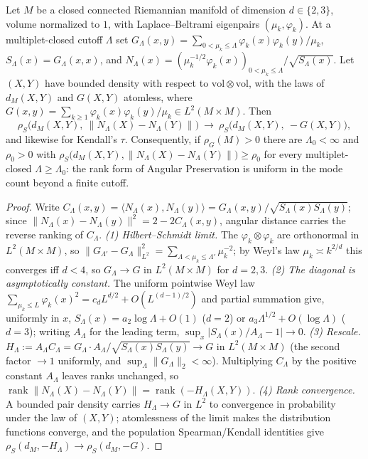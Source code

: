 \documentclass[review,supplement]{siamart220329}
\begin{document}
\begin{theorem}\label{thm:green-rank-limit}
Let $M$ be a closed connected Riemannian manifold of dimension $d\in\{2,3\}$, volume
normalized to $1$, with Laplace--Beltrami eigenpairs $(\mu_k,\varphi_k)$. At a
multiplet-closed cutoff $\Lambda$ set
$G_\Lambda(x,y)=\sum_{0<\mu_k\le\Lambda}\varphi_k(x)\varphi_k(y)/\mu_k$,
$S_\Lambda(x)=G_\Lambda(x,x)$, and
$N_\Lambda(x)=(\mu_k^{-1/2}\varphi_k(x))_{0<\mu_k\le\Lambda}/\sqrt{S_\Lambda(x)}$. Let
$(X,Y)$ have bounded density with respect to $\mathrm{vol}\otimes\mathrm{vol}$, with
the laws of $d_M(X,Y)$ and $G(X,Y)$ atomless, where
$G(x,y)=\sum_{k\ge1}\varphi_k(x)\varphi_k(y)/\mu_k\in L^2(M\times M)$. Then
\[
\rho_S\bigl(d_M(X,Y),\ \lVert N_\Lambda(X)-N_\Lambda(Y)\rVert\bigr)\ \longrightarrow\
\rho_S\bigl(d_M(X,Y),\ -G(X,Y)\bigr),
\]
and likewise for Kendall's $\tau$. Consequently, if $\rho_G(M)>0$ there are
$\Lambda_0<\infty$ and $\rho_0>0$ with
$\rho_S\bigl(d_M(X,Y),\lVert N_\Lambda(X)-N_\Lambda(Y)\rVert\bigr)\ge\rho_0$ for every
multiplet-closed $\Lambda\ge\Lambda_0$: the rank form of Angular Preservation is uniform
in the mode count beyond a finite cutoff.
\end{theorem}

\begin{proof}
Write $C_\Lambda(x,y)=\langle N_\Lambda(x),N_\Lambda(y)\rangle=
G_\Lambda(x,y)/\sqrt{S_\Lambda(x)S_\Lambda(y)}$; since
$\lVert N_\Lambda(x)-N_\Lambda(y)\rVert^2=2-2C_\Lambda(x,y)$, angular distance carries the
reverse ranking of $C_\Lambda$.
\emph{(1) Hilbert--Schmidt limit.} The $\varphi_k\otimes\varphi_k$ are orthonormal in
$L^2(M\times M)$, so $\lVert G_{\Lambda'}-G_\Lambda\rVert^2_{L^2}=
\sum_{\Lambda<\mu_k\le\Lambda'}\mu_k^{-2}$; by Weyl's law $\mu_k\asymp k^{2/d}$ this
converges iff $d<4$, so $G_\Lambda\to G$ in $L^2(M\times M)$ for $d=2,3$.
\emph{(2) The diagonal is asymptotically constant.} The uniform pointwise Weyl law
$\sum_{\mu_k\le L}\varphi_k(x)^2=c_dL^{d/2}+O(L^{(d-1)/2})$ and partial summation give,
uniformly in $x$, $S_\Lambda(x)=a_2\log\Lambda+O(1)$ ($d=2$) or
$a_3\Lambda^{1/2}+O(\log\Lambda)$ ($d=3$); writing $A_\Lambda$ for the leading term,
$\sup_x\lvert S_\Lambda(x)/A_\Lambda-1\rvert\to0$.
\emph{(3) Rescale.} $H_\Lambda:=A_\Lambda C_\Lambda=
G_\Lambda\cdot A_\Lambda/\sqrt{S_\Lambda(x)S_\Lambda(y)}\to G$ in $L^2(M\times M)$ (the
second factor $\to1$ uniformly, and $\sup_\Lambda\lVert G_\Lambda\rVert_2<\infty$).
Multiplying $C_\Lambda$ by the positive constant $A_\Lambda$ leaves ranks unchanged, so
$\operatorname{rank}\lVert N_\Lambda(X)-N_\Lambda(Y)\rVert=\operatorname{rank}(-H_\Lambda(X,Y))$.
\emph{(4) Rank convergence.} A bounded pair density carries $H_\Lambda\to G$ in $L^2$ to
convergence in probability under the law of $(X,Y)$; atomlessness of the limit makes the
distribution functions converge, and the population Spearman/Kendall identities give
$\rho_S(d_M,-H_\Lambda)\to\rho_S(d_M,-G)$.
\end{proof}
\end{document}
